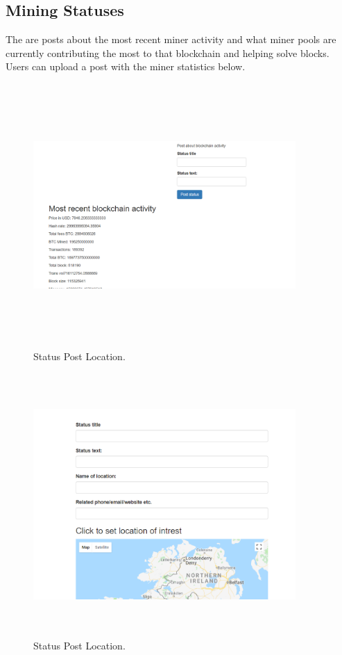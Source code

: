 \subsection{Mining Statuses}
The are posts about the most recent miner activity and what miner pools are currently contributing the most to that blockchain and helping solve blocks. Users can upload a post with the miner statistics below.
\begin{figure}[H]
\centering
\includegraphics[width=10cm, height=10cm]{img/post3.png}
\caption{Status Post Location.}
\end{figure}

\begin{figure}[H]
\centering
\includegraphics[width=10cm, height=10cm]{img/post4.png}
\caption{Status Post Location.}
\end{figure}

